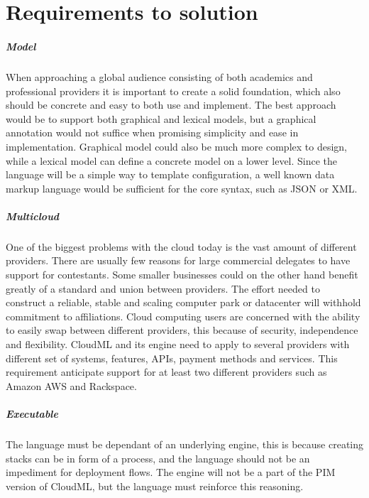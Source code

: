 \chapter{Requirements to solution}



\paragraph{Model}
When approaching a global audience consisting of both academics and professional providers it is important to create a solid foundation, 
which also should be concrete and easy to both use and implement.
The best approach would be to support both graphical and lexical models, 
but a graphical annotation would not suffice when promising simplicity and ease in implementation. 
Graphical model could also be much more complex to design, while a lexical model can define a concrete model on a lower level.
Since the language will be a simple way to template configuration, a well known data markup language would be sufficient for the core syntax, such as JSON or XML.

\paragraph{Multicloud}
One of the biggest problems with the cloud today is the vast amount of different providers. 
There are usually few reasons for large commercial delegates to have support for contestants. 
Some smaller businesses could on the other hand benefit greatly of a standard and union between providers.
The effort needed to construct a reliable, stable and scaling computer park or datacenter will withhold commitment to affiliations. 
Cloud computing users are concerned with the ability to easily swap between different providers, this because of security, 
independence and flexibility. CloudML and its engine need to apply to several providers with different set of systems, 
features, APIs, payment methods and services. This requirement anticipate support for at least two different providers such as Amazon AWS and Rackspace.

\paragraph{Executable}
The language must be dependant of an underlying engine, this is because creating stacks can be in form of a process, 
and the language should not be an impediment for deployment flows. The engine will not be a part of the PIM version of CloudML, 
but the language must reinforce this reasoning.

